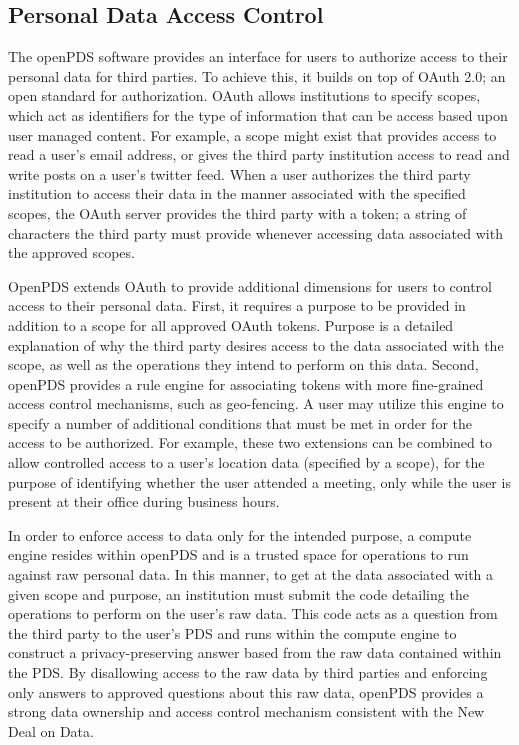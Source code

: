 \subsection{Personal Data Access Control}

The openPDS software provides an interface for users to authorize access to their personal data for third parties.
To achieve this, it builds on top of OAuth 2.0; an open standard for authorization.
OAuth allows institutions to specify scopes, which act as identifiers for the type of information that can be access based upon user managed content.
For example, a scope might exist that provides access to read a user's email address, or gives the third party institution access to read and write posts on a user's twitter feed.
When a user authorizes the third party institution to access their data in the manner associated with the specified scopes, the OAuth server provides the third party with a token; a string of characters the third party must provide whenever accessing data associated with the approved scopes.

OpenPDS extends OAuth to provide additional dimensions for users to control access to their personal data.
First, it requires a purpose to be provided in addition to a scope for all approved OAuth tokens. Purpose is a detailed explanation of why the third party desires access to the data associated with the scope, as well as the operations they intend to perform on this data.
Second, openPDS provides a rule engine for associating tokens with more fine-grained access control mechanisms, such as geo-fencing.
A user may utilize this engine to specify a number of additional conditions that must be met in order for the access to be authorized.
For example, these two extensions can be combined to allow controlled access to a user's location data (specified by a scope), for the purpose of identifying whether the user attended a meeting, only while the user is present at their office during business hours.

In order to enforce access to data only for the intended purpose, a compute engine resides within openPDS and is a trusted space for operations to run against raw personal data.
In this manner, to get at the data associated with a given scope and purpose, an institution must submit the code detailing the operations to perform on the user's raw data.
This code acts as a question from the third party to the user's PDS and runs within the compute engine to construct a privacy-preserving answer based from the raw data contained within the PDS. 
By disallowing access to the raw data by third parties and enforcing only answers to approved questions about this raw data, openPDS provides a strong data ownership and access control mechanism consistent with the New Deal on Data.

